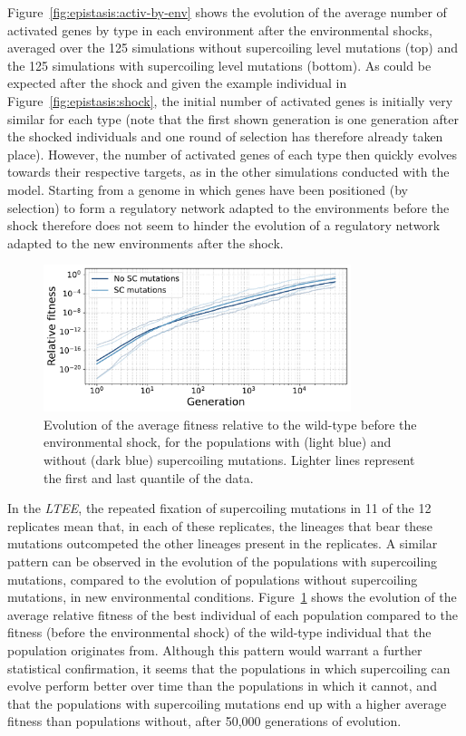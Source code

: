 Figure~\ref{fig:epistasis:activ-by-env} shows the evolution of the average number of activated genes by type in each environment after the environmental shocks, averaged over the 125 simulations without supercoiling level mutations (top) and the 125 simulations with supercoiling level mutations (bottom).
As could be expected after the shock and given the example individual in Figure~\ref{fig:epistasis:shock}, the initial number of activated genes is initially very similar for each type (note that the first shown generation is one generation after the shocked individuals and one round of selection has therefore already taken place).
However, the number of activated genes of each type then quickly evolves towards their respective targets, as in the other simulations conducted with the model.
Starting from a genome in which genes have been positioned (by selection) to form a regulatory network adapted to the environments before the shock therefore does not seem to hinder the evolution of a regulatory network adapted to the new environments after the shock.

\begin{figure}
\centering
\includegraphics[width=0.8\textwidth]{epistasis/img/relative_fitness_grouped.pdf}
\caption[Average relative fitness to the ancestor, during evolution after an environmental shock]{Evolution of the average fitness relative to the wild-type before the environmental shock, for the populations with (light blue) and without (dark blue) supercoiling mutations.
Lighter lines represent the first and last quantile of the data.}
\label{fig:epistasis:rel-fitness}
\end{figure}

In the \emph{LTEE}, the repeated fixation of supercoiling mutations in 11 of the 12 replicates mean that, in each of these replicates, the lineages that bear these mutations outcompeted the other lineages present in the replicates.
A similar pattern can be observed in the evolution of the populations with supercoiling mutations, compared to the evolution of populations without supercoiling mutations, in new environmental conditions.
Figure~\ref{fig:epistasis:rel-fitness} shows the evolution of the average relative fitness of the best individual of each population compared to the fitness (before the environmental shock) of the wild-type individual that the population originates from.
Although this pattern would warrant a further statistical confirmation, it seems that the populations in which supercoiling can evolve perform better over time than the populations in which it cannot, and that the populations with supercoiling mutations end up with a higher average fitness than populations without, after 50,000 generations of evolution.

